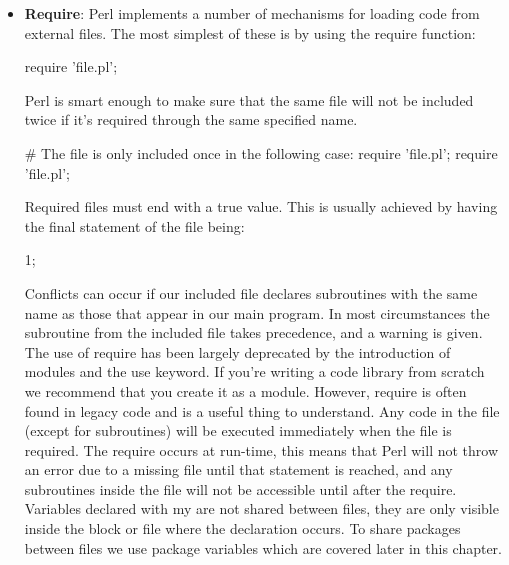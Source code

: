 \documentclass{report}
\begin{document}
    \pagebreak 
    \begin{itemize}
        \item \textbf{Require}: Perl implements a number of mechanisms for loading code from external files. The most simplest of these is by using the require function: 
            \bigbreak \noindent 
            \begin{perlcode}
            require 'file.pl';
            \end{perlcode}
            \bigbreak \noindent 
            Perl is smart enough to make sure that the same file will not be included twice if it’s required through the same specified name.
            \bigbreak \noindent 
            \begin{perlcode}
                # The file is only included once in the following case:
                require ’file.pl’;
                require ’file.pl’;
            \end{perlcode}
            \bigbreak \noindent 
            Required files must end with a true value. This is usually achieved by having the final statement of the file being:
            \bigbreak \noindent 
            \begin{perlcode}
            1;
            \end{perlcode}
            \bigbreak \noindent 
            Conflicts can occur if our included file declares subroutines with the same name as those that appear in our main program. In most circumstances the subroutine from the included file takes precedence, and a warning is given.
            \bigbreak \noindent 
            The use of require has been largely deprecated by the introduction of modules and the use keyword. If you’re writing a code library from scratch we recommend that you create it as a module. However, require is often found in legacy code and is a useful thing to understand.
            \bigbreak \noindent 
            Any code in the file (except for subroutines) will be executed immediately when the file is required. The require occurs at run-time, this means that Perl will not throw an error due to a missing file until that statement is reached, and any subroutines inside the file will not be accessible until after the require.
            \bigbreak \noindent 
            Variables declared with my are not shared between files, they are only visible inside the block or file where the declaration occurs. To share packages between files we use package variables which are covered later in this chapter.
            \bigbreak \noindent 

\end{itemize}
\end{document}
